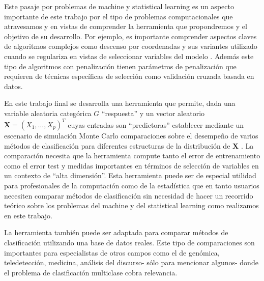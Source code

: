 \documentclass{report}
\begin{document}
 Este pasaje por problemas de machine  y statistical learning es un aspecto importante de este trabajo  por el tipo de problemas computacionales que atravesamos y en vistas de comprender la herramienta que propondremos y el objetivo de su desarrollo. Por ejemplo, es importante comprender aspectos claves de algoritmos complejos como descenso por coordenadas y sus variantes utilizado cuando se regulariza en vistas de seleccionar variables del modelo \cite{friedman2010, sarker2021}. Además este tipo de algoritmos con penalización tienen parámetros de penalización que requieren de técnicas específicas de selección como validación cruzada basada en datos. 



 En este trabajo final se desarrolla   una herramienta que permite, dada una va\-riable aleatoria  categórica $G$ ``respuesta'' y un vector aleatorio   $\mathbf{X}=(X_1,\ldots, X_p)^T$  cuyas entradas son ``predictoras'' establecer mediante un escenario de simulación Monte Carlo comparaciones sobre el desempeño de varios métodos de clasificación para diferentes estructuras de la distribución de $\mathbf{X}$ \citep{chen2017, casella2010}.  La comparación necesita que la herramienta compute tanto el error de entrenamiento como el error test y medidas importantes en términos de selección de variables en un contexto de ``alta dimensión''.    Esta  herramienta puede ser de especial utilidad para profesionales de la computación como  de la estadística que en tanto usuarios necesiten  comparar métodos de clasificación sin necesidad de hacer un recorrido teórico sobre los problemas del machine y del statistical learning como realizamos en este trabajo. 


 La herramienta también puede ser adaptada para comparar métodos de clasificación utilizando una base de datos reales.  Este tipo de comparaciones son importantes para especialistas de otros campos como el de genómica, teledetección, medicina, análisis del discurso- sólo para mencionar algunos- donde el problema de clasificación multiclase cobra relevancia. 


 
\end{document}
